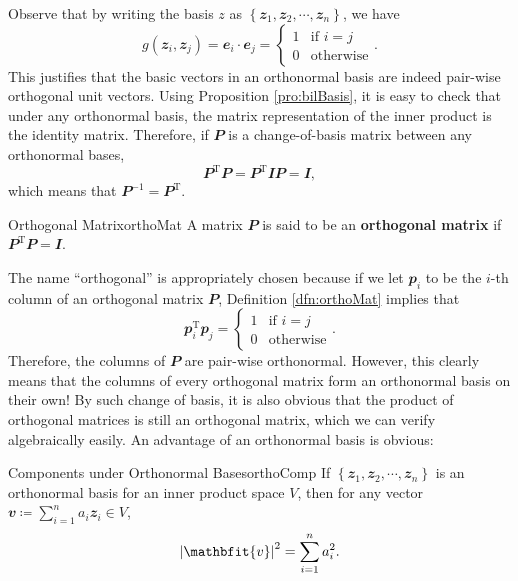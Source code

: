 \documentclass[math, code]{amznotes}
\theoremstyle{remark}
\newcommand{\I}{\mathbfit{I}}
\begin{document}
    Observe that by writing the basis $z$ as $\left\{\mathbfit{z}_1, \mathbfit{z}_2, \cdots, \mathbfit{z}_n\right\}$, we have 
    \begin{equation*}
        g\left(\mathbfit{z}_i, \mathbfit{z}_j\right) = \mathbfit{e}_i \cdot \mathbfit{e}_j = \begin{cases}
            1 & \textrm{if } i = j \\
            0 & \textrm{otherwise}
        \end{cases}.
    \end{equation*}
    This justifies that the basic vectors in an orthonormal basis are indeed pair-wise orthogonal unit vectors. Using Proposition \ref{pro:bilBasis}, it is easy to check that under any orthonormal basis, the matrix representation of the inner product is the identity matrix. Therefore, if $\mathbfit{P}$ is a change-of-basis matrix between any orthonormal bases,
    \begin{equation*}
        \mathbfit{P}^{\mathrm{T}}\mathbfit{P} = \mathbfit{P}^{\mathrm{T}}\I\mathbfit{P} = \I,
    \end{equation*}
    which means that $\mathbfit{P}^{-1} = \mathbfit{P}^{\mathrm{T}}$.
    \begin{dfnbox}{Orthogonal Matrix}{orthoMat}
        A matrix $\mathbfit{P}$ is said to be an {\color{red} \textbf{orthogonal matrix}} if $\mathbfit{P}^{\mathrm{T}}\mathbfit{P} = \I$.
    \end{dfnbox}
    The name ``orthogonal'' is appropriately chosen because if we let $\mathbfit{p}_i$ to be the $i$-th column of an orthogonal matrix $\mathbfit{P}$, Definition \ref{dfn:orthoMat} implies that 
    \begin{equation*}
        \mathbfit{p}_i^{\mathrm{T}}\mathbfit{p}_j = \begin{cases}
            1 & \textrm{if } i = j \\
            0 & \textrm{otherwise}
        \end{cases}.
    \end{equation*}
    Therefore, the columns of $\mathbfit{P}$ are pair-wise orthonormal. However, this clearly means that the columns of every orthogonal matrix form an orthonormal basis on their own! By such change of basis, it is also obvious that the product of orthogonal matrices is still an orthogonal matrix, which we can verify algebraically easily. An advantage of an orthonormal basis is obvious:
    \begin{probox}{Components under Orthonormal Bases}{orthoComp}
        If $\left\{\mathbfit{z}_1, \mathbfit{z}_2, \cdots, \mathbfit{z}_n\right\}$ is an orthonormal basis for an inner product space $V$, then for any vector $\mathbfit{v} \coloneqq \sum_{i = 1}^{n}a_i\mathbfit{z}_i \in V$, 
        \begin{equation*}
            \abs{\mathbfit{v}}^2 = \sum_{i = 1}^{n}a_i^2.
        \end{equation*}
    \end{probox}
\end{document}
